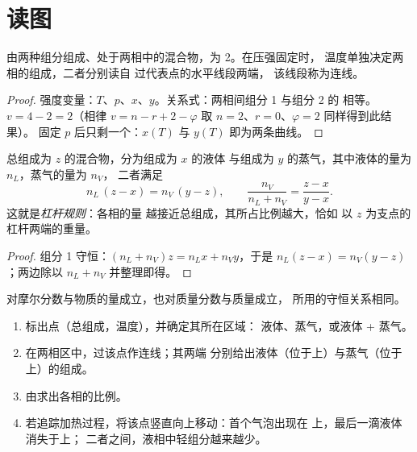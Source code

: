 \section{读图}

\begin{proposition}[两相二元体系的自由度]\label{prop:b2:liquid-vapour-diagrams:variance}
由两种组分组成、处于两相中的混合物，为 2。在压强固定时，
温度单独决定两相的组成，二者分别读自
过代表点的水平线段两端，
该线段称为连线。
\end{proposition}

\begin{proof}
强度变量：$T$、$p$、$x$、$y$。关系式：两相间组分 1 与组分 2 的
相等。$v = 4 - 2 = 2$（相律
$v = n - r + 2 - \varphi$ 取 $n = 2$、$r = 0$、$\varphi = 2$ 同样得到此结果）。
固定 $p$ 后只剩一个：$x(T)$ 与 $y(T)$ 即为两条曲线。
\end{proof}

\begin{theorem}[杠杆规则]\label{thm:b2:liquid-vapour-diagrams:lever}
总组成为 $z$ 的混合物，分为组成为 $x$ 的液体
与组成为 $y$ 的蒸气，其中液体的量为 $n_L$，蒸气的量为 $n_V$，
二者满足
\[
  n_L\,(z - x) = n_V\,(y - z), \qquad \frac{n_V}{n_L + n_V} = \frac{z - x}{y - x} .
\]
这就是\emph{杠杆规则}：各相的量
越接近总组成，其所占比例越大，恰如
以 $z$ 为支点的杠杆两端的重量。
\end{theorem}

\begin{proof}
组分 1 守恒：$(n_L + n_V)z = n_Lx + n_Vy$，于是 $n_L(z - x) =
n_V(y - z)$；两边除以 $n_L + n_V$ 并整理即得。
\end{proof}

对摩尔分数与物质的量成立，也对质量分数与质量成立，
所用的守恒关系相同。

\begin{method}[读取二元相图]\label{met:b2:liquid-vapour-diagrams:read-diagram}
\begin{enumerate}
  \item 标出点（总组成，温度），并确定其所在区域：
        液体、蒸气，或液体 + 蒸气。
  \item 在两相区中，过该点作连线；其两端
        分别给出液体（位于上）与蒸气（位于
        上）的组成。
  \item 由求出各相的比例。
  \item 若追踪加热过程，将该点竖直向上移动：首个气泡出现在
        上，最后一滴液体消失于上；
        二者之间，液相中轻组分越来越少。
\end{enumerate}
\end{method}

